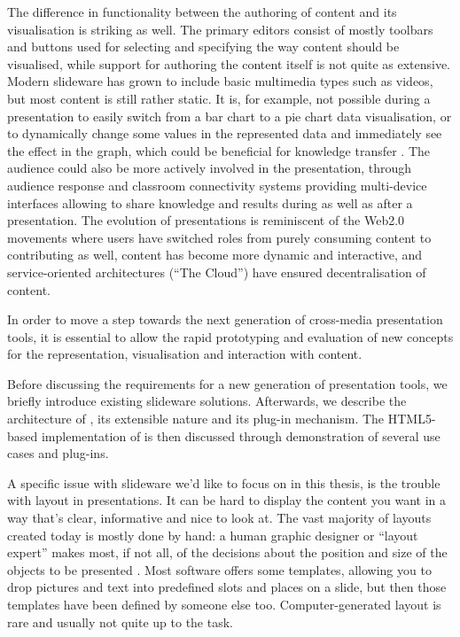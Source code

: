   The difference in functionality between the authoring of content and its
   visualisation is striking as well. The primary editors consist of mostly
   toolbars and buttons used for selecting and specifying the way content
   should be visualised, while support for authoring the content itself is not
   quite as extensive. Modern slideware has grown to include basic multimedia
   types such as videos, but most content is still rather static. It is, for
   example, not possible during a presentation to easily switch from a bar
   chart to a pie chart data visualisation, or to dynamically change some
   values in the represented data and immediately see the effect in the graph,
   which could be beneficial for knowledge transfer \citep{holzinger-1}. The
   audience could also be more actively involved in the presentation, through
   audience response and classroom connectivity systems providing multi-device
   interfaces allowing to share knowledge and results during as well as after a
   presentation. The evolution of presentations is reminiscent of the Web2.0
   movements where users have switched roles from purely consuming content to
   contributing as well, content has become more dynamic and interactive, and
   service-oriented architectures (``The Cloud'') have ensured decentralisation
   of content.

   In order to move a step towards the next generation of cross-media
   presentation tools, it is essential to allow the rapid prototyping and
   evaluation of new concepts for the representation, visualisation and
   interaction with content.

   Before discussing the requirements for a new generation of presentation
   tools, we briefly introduce existing slideware solutions. Afterwards, we
   describe the architecture of \mxp, its extensible nature and its plug-in
   mechanism. The HTML5-based implementation of \mxp is then discussed through
   demonstration of several use cases and \mxp plug-ins.

   A specific issue with slideware we'd like to focus on in this thesis, is the
   trouble with layout in presentations. It can be hard to display the content
   you want in a way that's clear, informative and nice to look at. The vast
   majority of layouts created today is mostly done by hand: a human graphic
   designer or ``layout expert'' makes most, if not all, of the decisions about
   the position and size of the objects to be presented \citep{lok-1}. Most
   software offers some templates, allowing you to drop pictures and text into
   predefined slots and places on a slide, but then those templates have been
   defined by someone else too. Computer-generated layout is rare and usually
   not quite up to the task.

